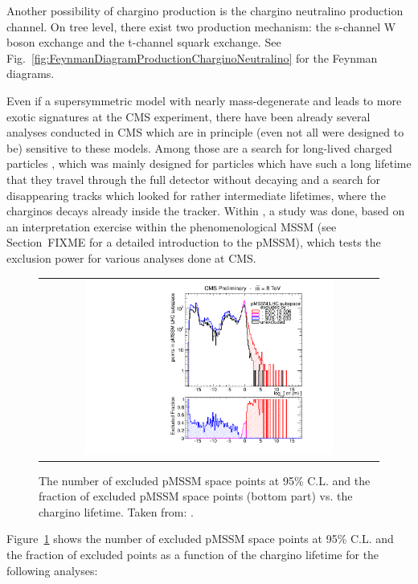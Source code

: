 Another possibility of chargino production is the chargino neutralino production channel. 
On tree level, there exist two production mechanism: the s-channel W boson exchange and the t-channel squark exchange. See Fig.~\ref{fig:FeynmanDiagramProductionCharginoNeutralino} for the Feynman diagrams.

Even if a supersymmetric model with nearly mass-degenerate \chipm and \chiO leads to more exotic signatures at the CMS experiment, there have been already several analyses conducted in CMS which are in principle (even not all were designed to be) sensitive to these models.
Among those are a search for long-lived charged particles \cite{bib:CMS:HSCP_8TeV}, which was mainly designed for particles which have such a long lifetime that they travel through the full detector without decaying and a search for disappearing tracks \cite{bib:CMS:DT_8TeV} which looked for rather intermediate lifetimes, where the charginos decays already inside the tracker. 
Within \cite{bib:CMS:DT_8TeV}, a study was done, based on an interpretation exercise \cite{bib:CMS:HSCPReinterpreation_PAS} within the phenomenological MSSM (see Section~FIXME for a detailed introduction to the pMSSM), which tests the exclusion power for various analyses done at CMS.
\begin{figure}[!t]
  \centering 
  \begin{tabular}{c}
    \includegraphics[width=0.75\textwidth]{figures/analysis/pMSSM_vs_ctau.pdf}
  \end{tabular}
  \caption{The number of excluded pMSSM space points at 95\% C.L. and the fraction of excluded pMSSM space points (bottom part) vs. the chargino lifetime.
           Taken from: \cite{bib:pMSSMplot_source_from_DT}.}
  \label{fig:pMSSMplot}
\end{figure}
Figure~\ref{fig:pMSSMplot} shows the number of excluded pMSSM space points at 95\% C.L. and the fraction of excluded points as a function of the chargino lifetime for the following analyses: 
